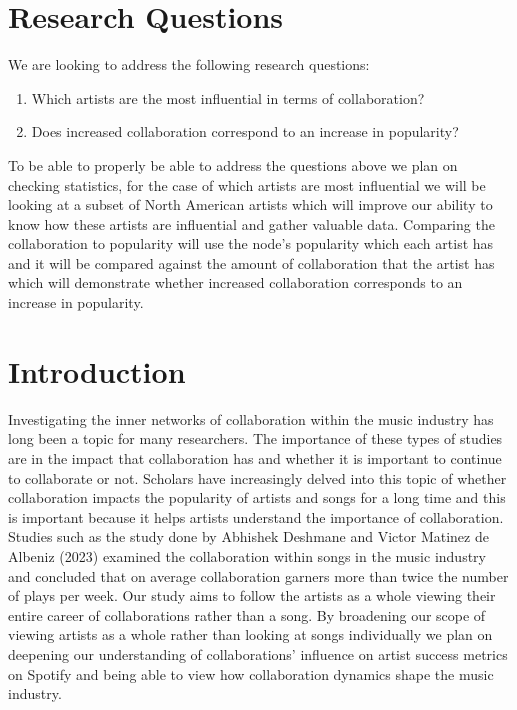 \documentclass[12pt,a4paper]{article}
\begin{document}



\section{Research Questions}%
We are looking to address the following research questions:
\begin{enumerate}
  \item Which artists are the most influential in terms of collaboration?
  \item Does increased collaboration correspond to an increase in popularity?
\end{enumerate}
To be able to properly be able to address the questions above we plan on checking statistics, for the case of which artists are most influential we will be looking at a subset of North American artists which will improve our ability to know how these artists are influential and gather valuable data.  Comparing the collaboration to popularity will use the node's popularity which each artist has and it will be compared against the amount of collaboration that the artist has which will demonstrate whether increased collaboration corresponds to an increase in popularity.
\section{Introduction}
Investigating the inner networks of collaboration within the music industry has long been a topic for many researchers.  The importance of these types of studies are in the impact that collaboration has and whether it is important to continue to collaborate or not.  Scholars have increasingly delved into this topic of whether collaboration impacts the popularity of artists and songs for a long time and this is important because it helps artists understand the importance of collaboration.\\

Studies such as the study done by Abhishek Deshmane and Victor Matinez de Albeniz (2023) examined the collaboration within songs in the music industry and concluded that on average collaboration garners more than twice the number of plays per week.  Our study aims to follow the artists as a whole viewing their entire career of collaborations rather than a song.  By broadening our scope of viewing artists as a whole rather than looking at songs individually we plan on deepening our understanding of collaborations' influence on artist success metrics on Spotify and being able to view how collaboration dynamics shape the music industry.\\
\end{document}
